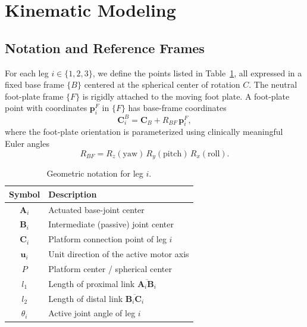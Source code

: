\documentclass[conference]{IEEEtran}
\begin{document}
\section{Kinematic Modeling}
\label{sec:kinematics}

\subsection{Notation and Reference Frames}

For each leg $i\in\{1,2,3\}$, we define the points listed in Table~\ref{tab:notation}, all expressed in a fixed base frame $\{B\}$ centered at the spherical center of rotation $C$. The neutral foot-plate frame $\{F\}$ is rigidly attached to the moving foot plate. A foot-plate point with coordinates $\mathbf{p}_i^F$ in $\{F\}$ has base-frame coordinates
\begin{equation}
\mathbf{C}_i^B = \mathbf{C}_B + R_{BF}\,\mathbf{p}_i^F,
\label{eq:platform-point}
\end{equation}
where the foot-plate orientation is parameterized using clinically meaningful Euler angles
\begin{equation}
R_{BF} = R_z(\mathrm{yaw})\,R_y(\mathrm{pitch})\,R_x(\mathrm{roll}).
\label{eq:rbf}
\end{equation}

\begin{table}[!t]
\centering
\caption{Geometric notation for leg $i$.}
\label{tab:notation}
\begin{tabular}{cl}
\toprule
\textbf{Symbol} & \textbf{Description}\\
\midrule
$\mathbf{A}_i$ & Actuated base-joint center\\
$\mathbf{B}_i$ & Intermediate (passive) joint center\\
$\mathbf{C}_i$ & Platform connection point of leg $i$\\
$\mathbf{u}_i$ & Unit direction of the active motor axis\\
$P$            & Platform center / spherical center\\
$l_1$          & Length of proximal link $\overline{\mathbf{A}_i\mathbf{B}_i}$\\
$l_2$          & Length of distal link  $\overline{\mathbf{B}_i\mathbf{C}_i}$\\
$\theta_i$     & Active joint angle of leg $i$\\
\bottomrule
\end{tabular}
\end{table}
\end{document}
